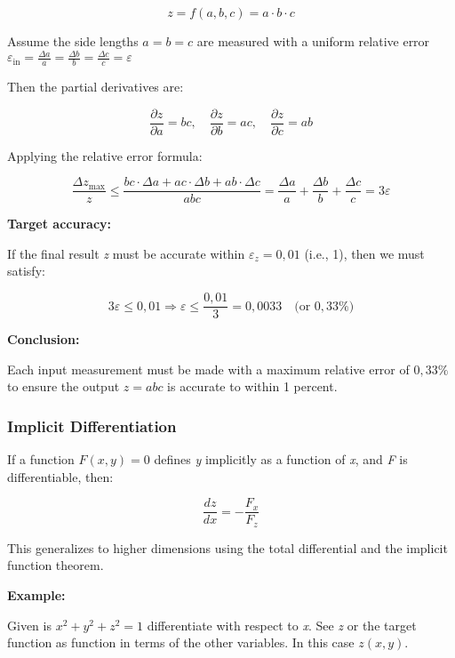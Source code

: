 \[
    z = f(a, b, c) = a \cdot b \cdot c
\]

Assume the side lengths \( a = b = c \) are measured with a uniform relative error 
\( \varepsilon_{\text{in}} = \frac{\Delta a}{a} = \frac{\Delta b}{b} = \frac{\Delta c}{c} = \varepsilon \)
\vspace{\baselineskip}

Then the partial derivatives are:

\[
    \frac{\partial z}{\partial a} = b c, \quad
    \frac{\partial z}{\partial b} = a c, \quad
    \frac{\partial z}{\partial c} = a b
\]

Applying the relative error formula:

\[
    \frac{\Delta z_{\max}}{z} \leq \frac{bc \cdot \Delta a + ac \cdot \Delta b + ab \cdot \Delta c}{abc}
    = \frac{\Delta a}{a} + \frac{\Delta b}{b} + \frac{\Delta c}{c} = 3 \varepsilon
\]

\textbf{Target accuracy:}  

If the final result \emph{z} must be accurate within \( \varepsilon_z = 0{,}01 \) (i.e., 1), then we must 
satisfy:

\[
    3 \varepsilon \leq 0{,}01 \Rightarrow \varepsilon \leq \frac{0{,}01}{3} = \boxed{0{,}0033} \quad 
    \text{(or } 0{,}33\% \text{)}
\]

\textbf{Conclusion:}
\vspace{\baselineskip}

Each input measurement must be made with a maximum relative error of \( \boxed{0{,}33\%} \) to ensure 
the output \( z = abc \) is accurate to within 1 percent.

\subsubsection{Implicit Differentiation}

If a function \( F(x, y) = 0 \) defines \emph{y} implicitly as a function of \emph{x}, and \emph{F} is 
differentiable, then:

\[
    \frac{dz}{dx} = -\frac{F_x}{F_z}
\]

This generalizes to higher dimensions using the total differential and the implicit function theorem.
\vspace{\baselineskip}

\textbf{Example:}
\vspace{\baselineskip}

Given is \(x^2 + y^2 + z^2 = 1\) differentiate with respect to \emph{x}.
See \emph{z} or the target function as function in terms of the other variables. 
In this case \(z(x,y)\).

